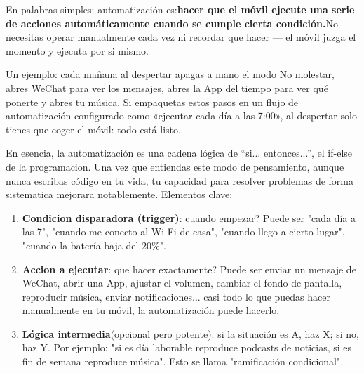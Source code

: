


En palabras simples: automatización es:\textbf{hacer que el móvil ejecute una serie de acciones automáticamente cuando se cumple cierta condición.}No necesitas operar manualmente cada vez ni recordar que hacer — el móvil juzga el momento y ejecuta por si mismo.

Un ejemplo: cada mañana al despertar apagas a mano el modo No molestar, abres WeChat para ver los mensajes, abres la App del tiempo para ver qué ponerte y abres tu música. Si empaquetas estos pasos en un flujo de automatización configurado como «ejecutar cada día a las 7:00», al despertar solo tienes que coger el móvil: todo está listo.

En esencia, la automatización es una cadena lógica de “si... entonces...”, el if-else de la programacion. Una vez que entiendas este modo de pensamiento, aunque nunca escribas código en tu vida, tu capacidad para resolver problemas de forma sistematica mejorara notablemente. Elementos clave:

\begin{enumerate}
  \item \textbf{Condicion disparadora (trigger)}: cuando empezar? Puede ser "cada día a las 7", "cuando me conecto al Wi-Fi de casa", "cuando llego a cierto lugar", "cuando la batería baja del 20\%".
  \item \textbf{Accion a ejecutar}: que hacer exactamente? Puede ser enviar un mensaje de WeChat, abrir una App, ajustar el volumen, cambiar el fondo de pantalla, reproducir música, enviar notificaciones... casi todo lo que puedas hacer manualmente en tu móvil, la automatización puede hacerlo.
  \item \textbf{Lógica intermedia}(opcional pero potente): si la situación es A, haz X; si no, haz Y. Por ejemplo: "si es día laborable reproduce podcasts de noticias, si es fin de semana reproduce música". Esto se llama "ramificación condicional".
\end{enumerate}

